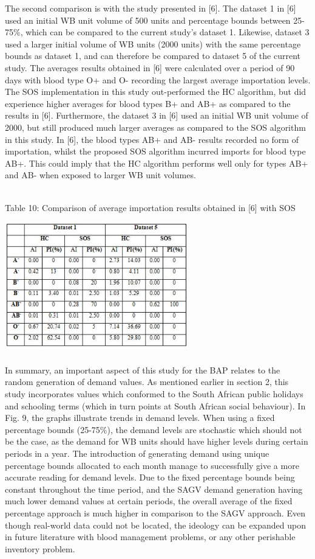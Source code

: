 \documentclass{article}
\begin{document}
The second comparison is with the study presented in [6]. The dataset 1 in [6] used an initial WB unit volume of 500 units and percentage bounds between 25-75\%, which can be compared to the current study’s dataset 1. Likewise, dataset 3 used a larger initial volume of WB units (2000 units) with the same percentage bounds as dataset 1, and can therefore be compared to dataset 5 of the current study. The averages results obtained in [6] were calculated over a period of 90 days with blood type O+ and O- recording the largest average importation levels. The SOS implementation in this study out-performed the HC algorithm, but did experience higher averages for blood types B+ and AB+ as compared to the results in [6]. Furthermore, the dataset 3 in [6] used an initial WB unit volume of 2000, but still produced much larger averages as compared to the SOS algorithm in this study. In [6], the blood types AB+ and AB- results recorded no form of importation, whilst the proposed SOS algorithm incurred imports for blood type AB+. This could imply that the HC algorithm performs well only for types AB+ and AB- when exposed to larger WB unit volumes.
\\
\\
\begin {center}
Table 10: {Comparison of average importation results obtained in [6] with SOS}

\end {center}
\includegraphics[width=0.6\textwidth, center]{Images/CompTab2.JPG}\\
\\
In summary, an important aspect of this study for the BAP relates to the random generation of demand values. As mentioned earlier in section 2, this study incorporates values which conformed to the South African public holidays and schooling terms (which in turn points at South African social behaviour). In Fig. 9, the graphs illustrate trends in demand levels. When using a fixed percentage bounds (25-75\%), the demand levels are stochastic which should not be the case, as the demand for WB units should have higher levels during certain periods in a year. The introduction of generating demand using unique percentage bounds allocated to each month manage to successfully give a more accurate reading for demand levels. Due to the fixed percentage bounds being constant throughout the time period, and the SAGV demand generation having much lower demand values at certain periods, the overall average of the fixed percentage approach is much higher in comparison to the SAGV approach. Even though real-world data could not be located, the ideology can be expanded upon in future literature with blood management problems, or any other perishable inventory problem.
\end{document}
